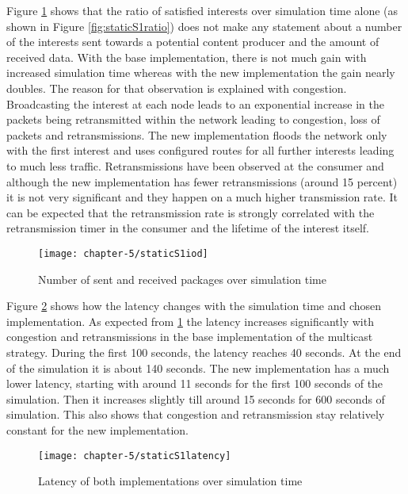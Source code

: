 Figure \ref{fig:staticS1iod} shows that the ratio of satisfied interests over simulation time alone (as shown in Figure \ref{fig:staticS1ratio}) does not make any statement about a number of the interests sent towards a potential content producer and the amount of received data. With the base implementation, there is not much gain with increased simulation time whereas with the new implementation the gain nearly doubles. The reason for that observation is explained with congestion. Broadcasting the interest at each node leads to an exponential increase in the packets being retransmitted within the network leading to congestion, loss of packets and retransmissions. The new implementation floods the network only with the first interest and uses configured routes for all further interests leading to much less traffic. Retransmissions have been observed at the consumer and although the new implementation has fewer retransmissions (around 15 percent) it is not very significant and they happen on a much higher transmission rate. It can be expected that the retransmission rate is strongly correlated with the retransmission timer in the consumer and the lifetime of the interest itself.

\begin{figure}[H]
  \centering
  \texttt{[image: chapter-5/staticS1iod]}
  \caption{Number of sent and received packages over simulation time}
  \label{fig:staticS1iod}
\end{figure}

Figure \ref{fig:staticS1latency} shows how the latency changes with the simulation time and chosen implementation. As expected from \ref{fig:staticS1iod} the latency increases significantly with congestion and retransmissions in the base implementation of the multicast strategy. During the first 100 seconds, the latency reaches 40 seconds. At the end of the simulation it is about 140 seconds. The new implementation has a much lower latency, starting with around 11 seconds for the first 100 seconds of the simulation. Then it increases slightly till around 15 seconds for 600 seconds of simulation. This also shows that congestion and retransmission stay relatively constant for the new implementation.

\begin{figure}[H]
  \centering
  \texttt{[image: chapter-5/staticS1latency]}
  \caption{Latency of both implementations over simulation time}
  \label{fig:staticS1latency}
\end{figure}

